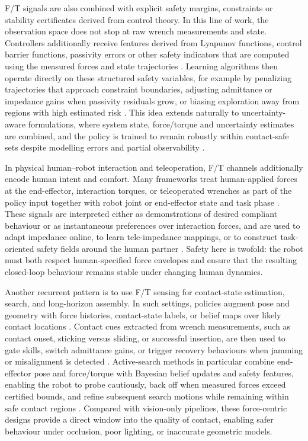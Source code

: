 \documentclass[Afour,sageh,times]{template/sagej}
\begin{document}
F/T signals are also combined with explicit safety margins, constraints or stability certificates derived from control theory. In this line of work, the observation space does not stop at raw wrench measurements and state. Controllers additionally receive features derived from Lyapunov functions, control barrier functions, passivity errors or other safety indicators that are computed using the measured forces and state trajectories \citep{14,16,29,59}. Learning algorithms then operate directly on these structured safety variables, for example by penalizing trajectories that approach constraint boundaries, adjusting admittance or impedance gains when passivity residuals grow, or biasing exploration away from regions with high estimated risk \citep{39,44,57,80}. This idea extends naturally to uncertainty-aware formulations, where system state, force/torque and uncertainty estimates are combined, and the policy is trained to remain robustly within contact-safe sets despite modelling errors and partial observability \citep{60,92}.

In physical human–robot interaction and teleoperation, F/T channels additionally encode human intent and comfort. Many frameworks treat human-applied forces at the end-effector, interaction torques, or teleoperated wrenches as part of the policy input together with robot joint or end-effector state and task phase \citep{11,17,24,58}. These signals are interpreted either as demonstrations of desired compliant behaviour or as instantaneous preferences over interaction forces, and are used to adapt impedance online, to learn tele-impedance mappings, or to construct task-oriented safety fields around the human partner \citep{15,52,69,76}. Safety here is twofold: the robot must both respect human-specified force envelopes and ensure that the resulting closed-loop behaviour remains stable under changing human dynamics.

Another recurrent pattern is to use F/T sensing for contact-state estimation, search, and long-horizon assembly. In such settings, policies augment pose and geometry with force histories, contact-state labels, or belief maps over likely contact locations \citep{3,7,26,55}. Contact cues extracted from wrench measurements, such as contact onset, sticking versus sliding, or successful insertion, are then used to gate skills, switch admittance gains, or trigger recovery behaviours when jamming or misalignment is detected \citep{29,32,37,72}. Active-search methods in particular combine end-effector pose and force/torque with Bayesian belief updates and safety features, enabling the robot to probe cautiously, back off when measured forces exceed certified bounds, and refine subsequent search motions while remaining within safe contact regions \citep{14,56,60,77}. Compared with vision-only pipelines, these force-centric designs provide a direct window into the quality of contact, enabling safer behaviour under occlusion, poor lighting, or inaccurate geometric models.
\end{document}
